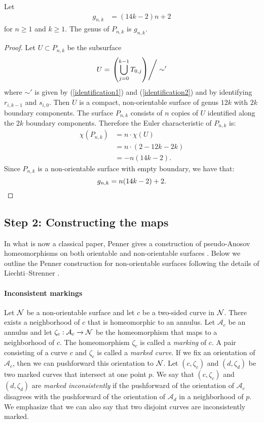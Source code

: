 \begin{lem}
\label{lem:genera}
Let
\begin{align*}
    g_{n,k} &= (14k - 2)n + 2
\end{align*} for $n \geq 1$ and $k \geq 1$.
    The genus of $P_{n,k}$ is $g_{n,k}$.
\end{lem}
\begin{proof}
  Let $U \subset P_{n,k}$ be the subsurface
  \begin{align*}
    U = \left. \left( \bigcup_{j =0}^{k-1} T_{0,j} \right)\right/\sim'
  \end{align*}
  where $\sim'$ is given by (\ref{identification1}) and (\ref{identification2}) and by identifying $r_{i,k-1}$ and $s_{i,0}$.
  Then $U$ is a compact, non-orientable surface of genus $12k$ with $2k$ boundary components.
  The surface $P_{n,k}$ consists of $n$ copies of $U$ identified along the $2k$ boundary components.  Therefore the Euler characteristic of $P_{n,k}$ is:
  \begin{align*}
    \chi(P_{n,k}) &= n \cdot \chi(U)\\
                  &=n\cdot(2-12k-2k)\\
                  &= -n(14k - 2).
  \end{align*}
  Since $P_{n,k}$ is a non-orientable surface with empty boundary, we have that:
  \begin{equation*}
    g_{n,k} = n(14k-2) + 2. \qedhere
  \end{equation*}
\end{proof}

\subsection*{Step 2: Constructing the maps}
In what is now a classical paper, Penner gives a construction of pseudo-Anosov homeomorphisms on both orientable and non-orientable surfaces \cite{penner1988construction}.  Below we outline the Penner construction for non-orientable surfaces following the details of Liechti--Strenner \cite[Section 2]{LS}.



 \paragraph{Inconsistent markings} Let $\mathcal{N}$ be a non-orientable surface and let $c$ be a two-sided curve in $\mathcal{N}$.  There exists a neighborhood of $c$ that is homeomorphic to an annulus.  Let $\mathcal{A}_c$ be an annulus and let $\zeta_c: \mathcal{A}_c \xrightarrow{} \mathcal{N}$ be the homeomorphism that maps to a neighborhood of $c$.  The homeomorphism $\zeta_c$ is called a \textit{marking} of $c$. A pair consisting of a curve $c$ and $\zeta_c$ is called a {\it marked curve}.
 If we fix an
orientation of $\mathcal{A}_c$, then we can pushforward this orientation to $\mathcal{N}$. Let
$(c,\zeta_c)$ and $(d,\zeta_d)$ be two marked curves that intersect at one point $p$.  We say that $(c,\zeta_c)$ and $(d,\zeta_d)$ are {\it marked inconsistently} if the
pushforward of the orientation of $\mathcal{A}_c$ disagrees with the pushforward of the orientation of $\mathcal{A}_d$ in a neighborhood of $p$.  We emphasize that we can also say that two disjoint curves are inconsistently marked.

